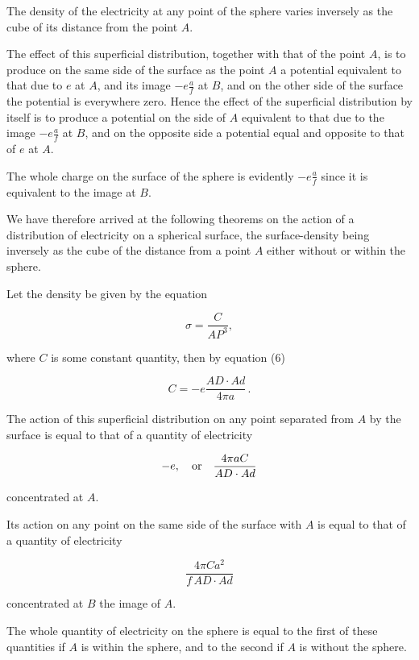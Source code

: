 \documentclass[11pt,a4paper]{article}
\begin{document}
The density of the electricity at any point of the sphere varies inversely as the cube of its distance from the point $A$.

The effect of this superficial distribution, together with that of the point $A$, is to produce on the same side of the surface as the point $A$ a potential equivalent to that due to $e$ at $A$, and its image $-e\frac{a}{f}$ at $B$, and on the other side of the surface the potential is everywhere zero. Hence the effect of the superficial distribution by itself is to produce a potential on the side of $A$ equivalent to that due to the image $-e\frac{a}{f}$ at $B$, and on the opposite side a potential equal and opposite to that of $e$ at $A$.

The whole charge on the surface of the sphere is evidently $-e\frac{a}{f}$ since it is equivalent to the image at $B$.

We have therefore arrived at the following theorems on the action of a distribution of electricity on a spherical surface, the surface-density being inversely as the cube of the distance from a point $A$ either without or within the sphere.

Let the density be given by the equation

\begin{equation}\tag{7}
\sigma=\frac{C}{AP^3},
\end{equation}

where $C$ is some constant quantity, then by equation (6)

\begin{equation}\tag{8}
C = -e \frac{AD \cdot Ad}{4\pi a} \,.
\end{equation}

The action of this superficial distribution on any point separated from $A$ by the surface is equal to that of a quantity of electricity

\[
-e,\quad\hbox{or}\quad
\frac{4\pi aC}{AD\cdot Ad}
\]

concentrated at $A$.

Its action on any point on the same side of the surface with $A$ is equal to that of a quantity of electricity

\[
\frac{4\pi Ca^2}{f\,AD\cdot Ad}
\]

concentrated at $B$ the image of $A$.

The whole quantity of electricity on the sphere is equal to the first of these quantities if $A$ is within the sphere, and to the second if $A$ is without the sphere.
\end{document}
